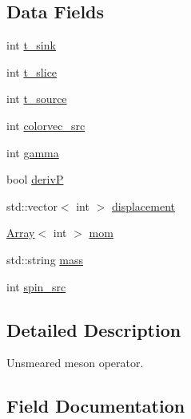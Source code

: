 \subsection*{Data Fields}
\begin{DoxyCompactItemize}
\item 
int \mbox{\hyperlink{structHadron_1_1KeyUnsmearedMesonElementalOperator__t_ab8ad223c7fbf85503f61bc76a3e4776a}{t\+\_\+sink}}
\item 
int \mbox{\hyperlink{structHadron_1_1KeyUnsmearedMesonElementalOperator__t_ab1dad327f8aa5096c593e4c9d0662a7d}{t\+\_\+slice}}
\item 
int \mbox{\hyperlink{structHadron_1_1KeyUnsmearedMesonElementalOperator__t_a832a42e8cf448bcaaeb24f8e12ea67ee}{t\+\_\+source}}
\item 
int \mbox{\hyperlink{structHadron_1_1KeyUnsmearedMesonElementalOperator__t_a3f855944e4f518791d562bafc37c8079}{colorvec\+\_\+src}}
\item 
int \mbox{\hyperlink{structHadron_1_1KeyUnsmearedMesonElementalOperator__t_a019eb338156c357aa6e858c87e48d155}{gamma}}
\item 
bool \mbox{\hyperlink{structHadron_1_1KeyUnsmearedMesonElementalOperator__t_ab87d732410105c7876a6c915de0e6c2f}{derivP}}
\item 
std\+::vector$<$ int $>$ \mbox{\hyperlink{structHadron_1_1KeyUnsmearedMesonElementalOperator__t_af898c57092186a18d10186659e011bf2}{displacement}}
\item 
\mbox{\hyperlink{classXMLArray_1_1Array}{Array}}$<$ int $>$ \mbox{\hyperlink{structHadron_1_1KeyUnsmearedMesonElementalOperator__t_a1fd40a8ad7064170f1515071a4f399d2}{mom}}
\item 
std\+::string \mbox{\hyperlink{structHadron_1_1KeyUnsmearedMesonElementalOperator__t_ac8d3133be319eb13571aed739be5aa5f}{mass}}
\item 
int \mbox{\hyperlink{structHadron_1_1KeyUnsmearedMesonElementalOperator__t_acd5e3224b89c68b7e3148c6382afc3a2}{spin\+\_\+src}}
\end{DoxyCompactItemize}


\subsection{Detailed Description}
Unsmeared meson operator. 

\subsection{Field Documentation}
\mbox{\label{structHadron_1_1KeyUnsmearedMesonElementalOperator__t_a3f855944e4f518791d562bafc37c8079}} 
